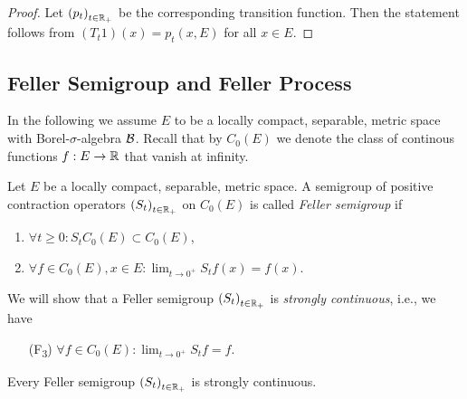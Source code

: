 \documentclass[../Master.tex]{subfiles}
\begin{document}
\begin{proof}
  Let \({(p_t)}_{t \in \mathbb{R}_+}\) be the corresponding transition function. Then the statement follows from \((T_t 1)(x) = p_t(x,E)\) for all \(x \in E\).
\end{proof}


\subsection{Feller Semigroup and Feller Process}

In the following we assume \(E\) to be a locally compact, separable, metric space with Borel-\(\sigma{}\)-algebra \(\mathcal{B}\). Recall that by \(C_0(E)\) we denote the class of continous functions \(f:E \to \mathbb{R}{}\) that vanish at infinity.


\begin{definition}
  Let \(E\) be a locally compact, separable, metric space. A semigroup of positive contraction operators \({(S_t)}_{t \in \mathbb{R}_+}\) on  \(C_0(E)\) is called \emph{Feller semigroup} if
  \begin{enumerate}[label = (F\textsubscript{\arabic*})]
    \item\label{cond:F_1} \(\forall t \ge 0: S_t C_0(E) \subset C_0(E)\),
    \item\label{cond:F_2} \(\forall f \in C_0(E), x \in E: \lim_{t \to 0^+} S_t f(x) = f(x)\).
  \end{enumerate}
\end{definition}

We will show that a Feller semigroup \({(S_t)}_{t \in \mathbb{R}_+}\) is \emph{strongly continuous}, i.e., we have
\begin{enumerate}
  \item[(F\textsubscript{3})] \(\forall f \in C_0(E): \lim_{t \to 0^+} S_t f = f\).
\end{enumerate}

\begin{theorem}\label{thm:strong_continuity}
  Every Feller semigroup \({(S_t)}_{t \in \mathbb{R}_+}\) is strongly continuous.
\end{theorem}
\end{document}
